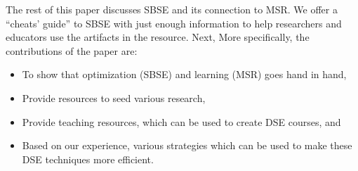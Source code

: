 \documentclass[table, xcdraw, sigconf,review, anonymous]{acmart}
\begin{document}

The rest of this paper discusses SBSE and its connection to MSR. 
We offer a ``cheats' guide'' to SBSE with just enough information to help researchers and educators use the artifacts in the resource. Next,  More specifically, the contributions of the paper are:
\begin{itemize}
    \item To show that optimization (SBSE) and learning (MSR) goes hand in hand,
    \item Provide resources to seed various research,
    \item Provide teaching resources, which can be used to create DSE courses, and
    \item Based on our experience, various strategies which can be used to make these DSE techniques more efficient.
\end{itemize}


 



 

\end{document}
